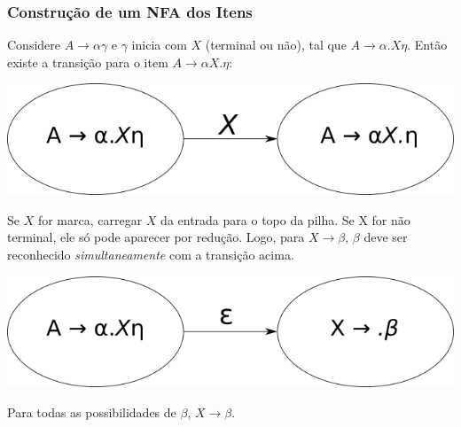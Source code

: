 \documentclass[table]{beamer}
\begin{document}
\begin{frame}
   \frametitle{Construção de um NFA dos Itens}
    Considere $A\to\alpha\gamma$ e $\gamma$ inicia com $X$ (terminal ou não), tal que $A\to\alpha.X\eta$. Então existe a transição para o item $A\to\alpha X.\eta$: 
   \begin{center}
   \includegraphics[scale=0.4]{figuras/nfa1.png}
   \end{center}
   Se $X$ for marca, carregar $X$ da entrada para o topo da pilha. Se X for não terminal, ele só pode aparecer por redução. Logo, para $X\to\beta$, $\beta$ deve ser reconhecido \textit{simultaneamente} com a transição acima.
   \begin{center}
   \includegraphics[scale=0.4]{figuras/nfa2.png}
   \end{center}
   Para todas as possibilidades de $\beta$, $X\to\beta$.
\end{frame}
\end{document}
